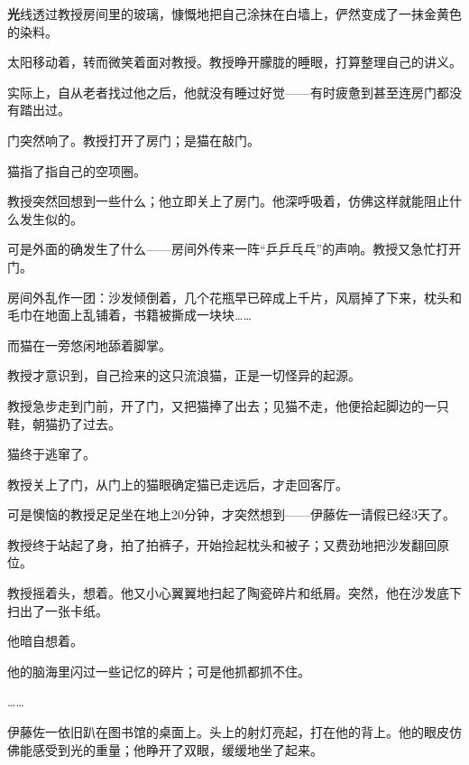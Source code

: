 
\AddSymbolsE
\pagecolor{Periwinkle!30!Gray}
\color{white}
\quad\quad \lettrine[,lraise=0.2,lhang=0.5]{\textbf{光}}{线}透过教授房间里的玻璃，慷慨地把自己涂抹在白墙上，俨然变成了一抹金黄色的染料。

太阳移动着，转而微笑着面对教授。教授睁开朦胧的睡眼，打算整理自己的讲义。

实际上，自从老者找过他之后，他就没有睡过好觉——有时疲惫到甚至连房门都没有踏出过。


门突然响了。教授打开了房门；是猫在敲门。

猫指了指自己的空项圈。

教授突然回想到一些什么；他立即关上了房门。他深呼吸着，仿佛这样就能阻止什么发生似的。

可是外面的确发生了什么——房间外传来一阵“乒乒乓乓”的声响。教授又急忙打开门。


房间外乱作一团：沙发倾倒着，几个花瓶早已碎成上千片，风扇掉了下来，枕头和毛巾在地面上乱铺着，书籍被撕成一块块……

而猫在一旁悠闲地舔着脚掌。

教授才意识到，自己捡来的这只流浪猫，正是一切怪异的起源。


教授急步走到门前，开了门，又把猫捧了出去；见猫不走，他便拾起脚边的一只鞋，朝猫扔了过去。

猫终于逃窜了。

教授关上了门，从门上的猫眼确定猫已走远后，才走回客厅。


可是懊恼的教授足足坐在地上20分钟，才突然想到——伊藤佐一请假已经3天了。


教授终于站起了身，拍了拍裤子，开始捡起枕头和被子；又费劲地把沙发翻回原位。

教授摇着头，想着。他又小心翼翼地扫起了陶瓷碎片和纸屑。突然，他在沙发底下扫出了一张卡纸。

他暗自想着。

他的脑海里闪过一些记忆的碎片；可是他抓都抓不住。


……

伊藤佐一依旧趴在图书馆的桌面上。头上的射灯亮起，打在他的背上。他的眼皮仿佛能感受到光的重量；他睁开了双眼，缓缓地坐了起来。

